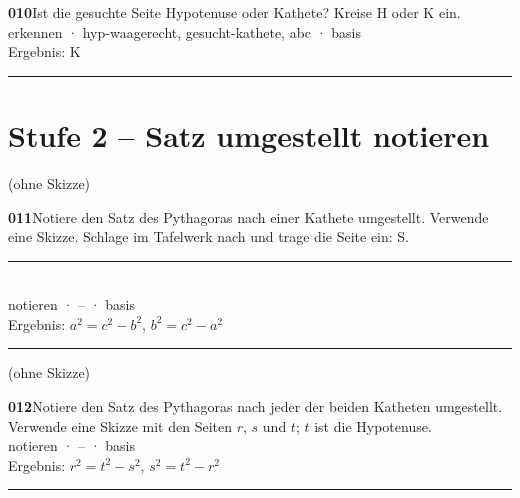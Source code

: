 \documentclass[10pt]{article}
\begin{document}
\begin{minipage}[t]{\linewidth}
\parbox[t]{5.8cm}{}\hfill\parbox[t]{11.6cm}{\textbf{010}\quad Ist die gesuchte Seite Hypotenuse oder Kathete? Kreise H oder K ein.\\[2pt]{\color{gray}\footnotesize erkennen · hyp-waagerecht, gesucht-kathete, abc · basis\\Ergebnis: K}}
\end{minipage}\par\medskip\hrule\medskip
\clearpage
\section*{Stufe 2 – Satz umgestellt notieren}
\begin{minipage}[t]{\linewidth}
\parbox[t]{5.8cm}{\parbox[t]{5.5cm}{\color{gray}\small (ohne Skizze)}}\hfill\parbox[t]{11.6cm}{\textbf{011}\quad Notiere den Satz des Pythagoras nach einer Kathete umgestellt. Verwende eine Skizze. Schlage im Tafelwerk nach und trage die Seite ein: S.~\rule{1.2cm}{0.4pt}\\[2pt]{\color{gray}\footnotesize notieren · – · basis\\Ergebnis: $a^2 = c^2 - b^2$, $b^2 = c^2 - a^2$}}
\end{minipage}\par\medskip\hrule\medskip
\begin{minipage}[t]{\linewidth}
\parbox[t]{5.8cm}{\parbox[t]{5.5cm}{\color{gray}\small (ohne Skizze)}}\hfill\parbox[t]{11.6cm}{\textbf{012}\quad Notiere den Satz des Pythagoras nach jeder der beiden Katheten umgestellt. Verwende eine Skizze mit den Seiten $r$, $s$ und $t$; $t$ ist die Hypotenuse.\\[2pt]{\color{gray}\footnotesize notieren · – · basis\\Ergebnis: $r^2 = t^2 - s^2$, $s^2 = t^2 - r^2$}}
\end{minipage}\par\medskip\hrule\medskip
\clearpage
\end{document}

